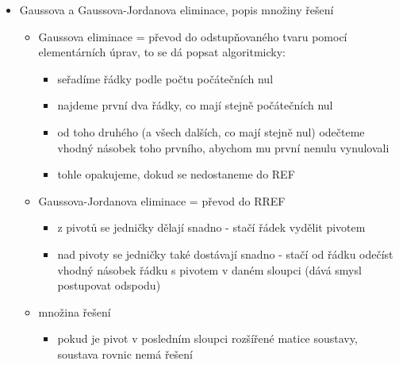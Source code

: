 \begin{itemize}
\begin{itemize}
\begin{itemize}
\begin{itemize}
\item k formální definici bychom zavedli notaci $j(i)$ pro pozici prvního nenulového prvku v $i$-tém řádku
\end{itemize}
\item první nenulový prvek nenulového řádku se nazývá pivot, pod pivotem jsou v REF všechny prvky nulové
\item pro soustavu $A'x = b'$ s $A'$ v REF jsou proměnné odpovídající sloupcům s pivoty bázické, ostatní jsou volné
\end{itemize}
\item redukovaný odstupňovaný tvar (RREF)
\begin{itemize}
\item pivoty jsou jednotkové
\item nad i pod pivoty jsou nuly
\end{itemize}
\end{itemize}
\item Gaussova a Gaussova-Jordanova eliminace, popis množiny řešení
\begin{itemize}
\item Gaussova eliminace = převod do odstupňovaného tvaru pomocí elementárních úprav, to se dá popsat algoritmicky:
\begin{itemize}
\item seřadíme řádky podle počtu počátečních nul
\item najdeme první dva řádky, co mají stejně počátečních nul
\item od toho druhého (a všech dalších, co mají stejně nul) odečteme vhodný násobek toho prvního, abychom mu první nenulu vynulovali
\item tohle opakujeme, dokud se nedostaneme do REF
\end{itemize}
\item Gaussova-Jordanova eliminace = převod do RREF
\begin{itemize}
\item z pivotů se jedničky dělají snadno - stačí řádek vydělit pivotem
\item nad pivoty se jedničky také dostávají snadno - stačí od řádku odečíst vhodný násobek řádku s pivotem v daném sloupci (dává smysl postupovat odspodu)
\end{itemize}
\item množina řešení
\begin{itemize}
\item pokud je pivot v posledním sloupci rozšířené matice soustavy, soustava rovnic nemá řešení

\end{itemize}
\end{itemize}
\end{itemize}
